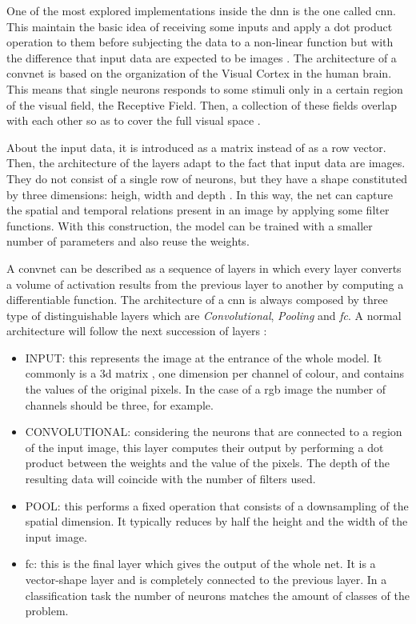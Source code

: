 
	One of the most explored implementations inside the \acrshort{dnn} is the one called \acrfull{cnn}. This maintain the basic idea of receiving some inputs and apply a dot product operation to them before subjecting the data to a non-linear function but with the difference that input data are expected to be images \cite{Karpathy2016}. The architecture of a \acrlong{convnet} is based on the organization of the Visual Cortex in the human brain. This means that single neurons responds to some stimuli only in a certain region of the visual field, the Receptive Field. Then, a collection of these fields overlap with each other so as to cover the full visual space \cite{Saha2018}.
	
	About the input data, it is introduced as a matrix instead of as a row vector. Then, the architecture of the layers adapt to the fact that input data are images. They do not consist of a single row of neurons, but they have a shape constituted by three dimensions: heigh, width and depth \cite{Karpathy2016}. In this way, the net can capture the spatial and temporal relations present in an image by applying some filter functions. With this construction, the model can be trained with a smaller number of parameters and also reuse the weights.
	
	A \acrlong{convnet} can be described as a sequence of layers in which every layer converts a volume of activation results from the previous layer to another by computing a differentiable function. The architecture of a \acrshort{cnn} is always composed by three type of distinguishable layers which are \textit{Convolutional}, \textit{Pooling} and \textit{\acrlong{fc}}. A normal architecture will follow the next succession of layers \cite{Karpathy2016}:
	
	\begin{itemize}
		\item INPUT: this represents the image at the entrance of the whole model. It commonly is a 3\acrshort{d} matrix , one dimension per channel of colour, and contains the values of the original pixels. In the case of a \acrshort{rgb} image the number of channels should be three, for example.
		\item CONVOLUTIONAL: considering the neurons that are connected to a region of the input image, this layer computes their output by performing a dot product between the weights and the value of the pixels. The depth of the resulting data will coincide with the number of filters used.
		\item POOL: this performs a fixed operation that consists of a downsampling of the spatial dimension. It typically reduces by half the height and the width of the input image.
		\item \acrshort{fc}: this is the final layer which gives the output of the whole net. It is a vector-shape layer and is completely connected to the previous layer. In a classification task the number of neurons matches the amount of classes of the problem.
	\end{itemize}
	
